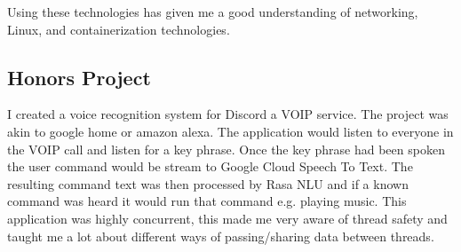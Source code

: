 \documentclass[a4paper]{cv}
\begin{document}
\begin{minipage}[t]{0.60\textwidth}
Using these technologies has given me a good understanding of networking, Linux, and containerization technologies.

\sectionspace
\subsection{Honors Project}
I created a voice recognition system for Discord a VOIP service. The project was akin to google home or amazon alexa. The application would listen to everyone in the VOIP call and listen for a key phrase. Once the key phrase had been spoken the user command would be stream to Google Cloud Speech To Text. The resulting command text was then processed by Rasa NLU and if a known command was heard it would run that command e.g. playing music. This application was highly concurrent, this made me very aware of thread safety and taught me a lot about different ways of passing/sharing data between threads. 
\end{minipage}
\end{document}
